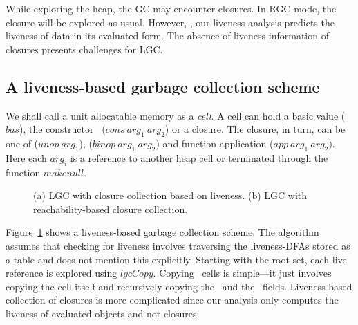 \documentclass[9pt]{sigplanconf}
\newcommand{\cred}[1]{{\color{red}{#1}}}
\begin{document}
While exploring the heap, the  GC may encounter closures. In RGC mode,
the  closure will  be explored  as  usual. However,  \cred{  as
  mentioned earlier}, our liveness analysis predicts the liveness of
data in its evaluated form. The absence of liveness information of
closures presents challenges for LGC.


\subsection{A liveness-based garbage collection scheme}
We shall call  a unit allocatable memory as a {\em  cell}.  A cell can
hold  a  basic  value   ($\mathit{bas}$),  the  constructor  \CONS\  $(\mathit{cons~
arg_1~arg_2}$) or   a closure.  The closure, in  turn, can be  one of
($\mathit{unop~arg_1}$),  ($\mathit{ binop~arg_1~arg_2}$)  and  function  application
($\mathit{app~arg_1~arg_2})$.  Here each $\mathit{ arg_i}$ is a reference to another heap
cell or terminated through the function $\mathit{makenull}$. 

\begin{figure}[t!]
\label{fig:algos}
\hfill
{}
\hfill
{}
\hfill
\caption{(a) LGC with closure collection based on liveness.  (b)
  LGC with reachability-based closure collection.}
    
\end{figure}
 
  
Figure~\ref{fig:algos}  shows   a  liveness-based  garbage  collection
scheme.   The algorithm  assumes that  checking for  liveness involves
traversing the  liveness-DFAs stored as  a table and does  not mention
this explicitly.  Starting  with the root set, each  live reference is
explored   using  $\mathit{  lgcCopy}$.    Copying  \CONS\   cells  is
simple---it  just involves  copying  the cell  itself and  recursively
copying the \CAR\ and  the \CDR\ fields.  Liveness-based collection of
closures  is more  complicated since  our analysis  only  computes the
liveness of evaluated objects and not closures.
\end{document}
